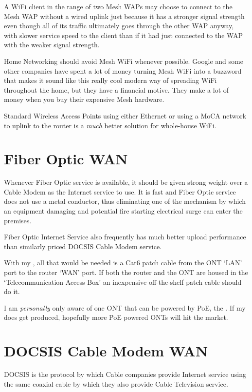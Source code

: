 A WiFi client in the range of two Mesh WAPs may choose to connect to the Mesh WAP without a wired uplink
just because it has a stronger signal strength even though all of its traffic ultimately goes through
the other WAP anyway, with slower service speed to the client than if it had just connected to the WAP with
the weaker signal strength.

Home Networking should avoid Mesh WiFi whenever possible. Google and some other companies have spent a
lot of money turning Mesh WiFi into a buzzword that makes it sound like this really cool modern way of
spreading WiFi throughout the home, but they have a financial motive. They make a lot of money when
you buy their expensive Mesh hardware.

Standard Wireless Access Points using either Ethernet or using a MoCA network to
uplink to the router is a \emph{much} better solution for whole-house WiFi.

\section{Fiber Optic WAN}

Whenever Fiber Optic service is available, it should be given strong weight over a Cable Modem as the
Internet service to use. It is fast and Fiber Optic service does not use a metal conductor,
thus eliminating one of the mechanism by which an equipment damaging and potential fire starting
electrical surge can enter the premises.

Fiber Optic Internet Service also frequently has much better upload performance than similarly priced
DOCSIS Cable Modem service.

With my , all that would be needed is a Cat6 patch cable from the ONT `LAN'
port to the router `WAN' port. If both the router and the ONT are housed in the `Telecommunication
Access Box' an inexpensive off-the-shelf patch cable should do it.

I am \emph{personally} only aware of one ONT that can be powered by PoE, the
. If my 
does get produced, hopefully more PoE powered ONTs will hit the market.

\section{DOCSIS Cable Modem WAN}

DOCSIS is the protocol by which Cable companies provide Internet service using the same coaxial cable
by which they also provide Cable Television service.

